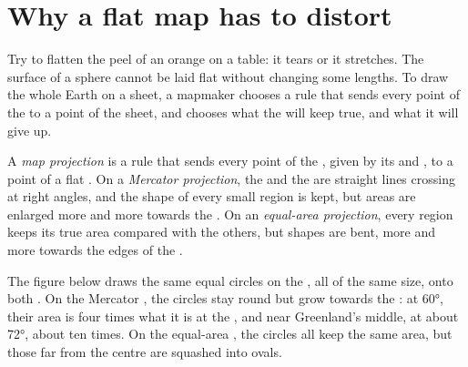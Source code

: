 \section{Why a flat map has to distort}

Try to flatten the peel of an orange on a table: it tears or it stretches.
The surface of a sphere cannot be laid flat without changing some lengths.
To draw the whole Earth on a sheet, a mapmaker chooses a rule that sends
every point of the  to a point of the sheet, and chooses what the 
will keep true, and what it will give up.

\begin{definition}\label{def:g9:maps-of-the-earth:projection}
A \emph{map projection} is a rule that sends every
point of the , given by its  and , to a point of a
flat . On a \emph{Mercator projection}, the
 and the  are straight lines crossing at right angles,
and the shape of every small region is kept, but areas are enlarged more
and more towards the . On an \emph{equal-area
projection}, every region keeps its true
area compared with the others, but shapes are bent, more and more towards
the edges of the .
\end{definition}

The figure below draws the same equal circles on the , all of the same
size, onto both . On the Mercator , the circles stay round but grow
towards the : at  \ang{60}, their area is four times what it
is at the , and near Greenland's middle, at about \ang{72}, about
ten times. On the equal-area , the circles all keep the same area, but
those far from the centre are squashed into ovals.

